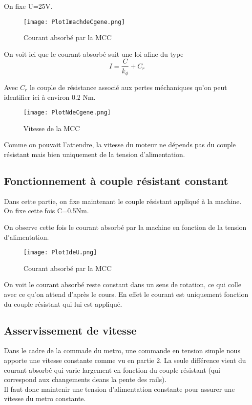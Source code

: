 \documentclass[oneside,a4paper,12pt]{article}
\begin{document}
		
		On fixe U=25V.
		
		\begin{figure}[h]
			\centering
			\texttt{[image: PlotImachdeCgene.png]}
			\caption{Courant absorbé par la MCC}
		\end{figure}
	
		On voit ici que le courant absorbé suit une loi afine du type $$ I=\frac{C}{k_{\phi}} + C_{r} $$
		
		Avec $C_{r}$ le couple de résistance associé aux pertes méchaniques qu'on peut identifier ici à environ 0.2 Nm.

		\begin{figure}[h]
			\centering
			\texttt{[image: PlotNdeCgene.png]}
			\caption{Vitesse de la MCC}
		\end{figure}
	
		Comme on pouvait l'attendre, la vitesse du moteur ne dépends pas du couple résistant mais bien uniquement de la tension d'alimentation.
	
	\subsection{Fonctionnement à couple résistant constant}
	
	Dans cette partie, on fixe maintenant le couple résistant appliqué à la machine.
	On fixe cette fois C=0.5Nm.
	
	On observe cette fois le courant absorbé par la machine en fonction de la tension d'alimentation.
	
	\begin{figure}[h]
		\centering
		\texttt{[image: PlotIdeU.png]}
		\caption{Courant absorbé par la MCC}
	\end{figure}

	On voit le courant absorbé reste constant dans un sens de rotation, ce qui colle avec ce qu'on attend d'après le cours. En effet le courant est uniquement fonction du couple résistant qui lui est appliqué.
	
	\subsection{Asservissement de vitesse}
	
	Dans le cadre de la commade du metro, une commande en tension simple nous apporte une vitesse constante comme vu en partie 2. La seule différence vient du courant absorbé qui varie largement en fonction du couple résistant (qui correspond aux changements deans la pente des rails).\\
	Il faut donc maintenir une tension d'alimentation constante pour assurer une vitesse du metro constante.\\
	
\end{document}
